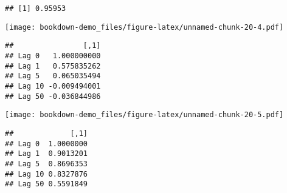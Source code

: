 \documentclass[]{book}
\newenvironment{Shaded}{\begin{snugshade}}{\end{snugshade}}
\newcommand{\KeywordTok}[1]{\textcolor[rgb]{0.13,0.29,0.53}{\textbf{#1}}}
\newcommand{\OperatorTok}[1]{\textcolor[rgb]{0.81,0.36,0.00}{\textbf{#1}}}
\newcommand{\NormalTok}[1]{#1}
\begin{document}
\begin{verbatim}
## [1] 0.95953
\end{verbatim}

\begin{Shaded}
\end{Shaded}

\texttt{[image: bookdown-demo\_files/figure-latex/unnamed-chunk-20-4.pdf]}

\begin{Shaded}
\end{Shaded}

\begin{verbatim}
##                [,1]
## Lag 0   1.000000000
## Lag 1   0.575835262
## Lag 5   0.065035494
## Lag 10 -0.009494001
## Lag 50 -0.036844986
\end{verbatim}

\begin{Shaded}
\end{Shaded}

\texttt{[image: bookdown-demo\_files/figure-latex/unnamed-chunk-20-5.pdf]}

\begin{Shaded}
\end{Shaded}

\begin{verbatim}
##             [,1]
## Lag 0  1.0000000
## Lag 1  0.9013201
## Lag 5  0.8696353
## Lag 10 0.8327876
## Lag 50 0.5591849
\end{verbatim}
\end{document}
